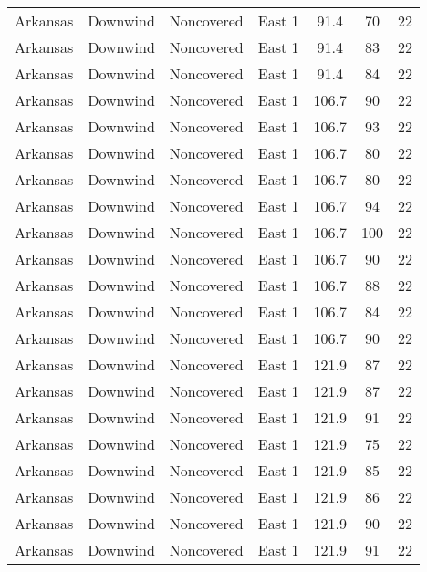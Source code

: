 \documentclass{article}
\begin{document}
\begin{longtable}[H]{ccccccc}
Arkansas & Downwind  & Noncovered & East 1        & 91.4         & 70          & 22  \\
Arkansas & Downwind  & Noncovered & East 1        & 91.4         & 83          & 22  \\
Arkansas & Downwind  & Noncovered & East 1        & 91.4         & 84          & 22  \\
Arkansas & Downwind  & Noncovered & East 1        & 106.7        & 90          & 22  \\
Arkansas & Downwind  & Noncovered & East 1        & 106.7        & 93          & 22  \\
Arkansas & Downwind  & Noncovered & East 1        & 106.7        & 80          & 22  \\
Arkansas & Downwind  & Noncovered & East 1        & 106.7        & 80          & 22  \\
Arkansas & Downwind  & Noncovered & East 1        & 106.7        & 94          & 22  \\
Arkansas & Downwind  & Noncovered & East 1        & 106.7        & 100         & 22  \\
Arkansas & Downwind  & Noncovered & East 1        & 106.7        & 90          & 22  \\
Arkansas & Downwind  & Noncovered & East 1        & 106.7        & 88          & 22  \\
Arkansas & Downwind  & Noncovered & East 1        & 106.7        & 84          & 22  \\
Arkansas & Downwind  & Noncovered & East 1        & 106.7        & 90          & 22  \\
Arkansas & Downwind  & Noncovered & East 1        & 121.9        & 87          & 22  \\
Arkansas & Downwind  & Noncovered & East 1        & 121.9        & 87          & 22  \\
Arkansas & Downwind  & Noncovered & East 1        & 121.9        & 91          & 22  \\
Arkansas & Downwind  & Noncovered & East 1        & 121.9        & 75          & 22  \\
Arkansas & Downwind  & Noncovered & East 1        & 121.9        & 85          & 22  \\
Arkansas & Downwind  & Noncovered & East 1        & 121.9        & 86          & 22  \\
Arkansas & Downwind  & Noncovered & East 1        & 121.9        & 90          & 22  \\
Arkansas & Downwind  & Noncovered & East 1        & 121.9        & 91          & 22  \\

\end{longtable}
\end{document}
